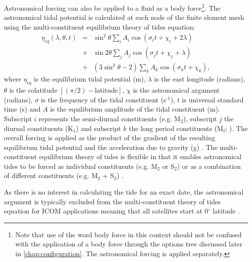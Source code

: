 Astronomical forcing can also be applied to a fluid as a body force\footnote{Note that use of the word body force in this context should not be confused with the application of a body force through the options tree discussed later in \ref{chap:configuration}. The astronomical forcing is applied separately.}. 
The astronomical tidal potential is calculated at each node of the finite element mesh using the 
multi-constituent equilibrium theory of tides equation:
  \begin{eqnarray}
\eta_{eq}\left(\lambda,\theta,t\right)&=&\sin^{2}\theta\sum_{i}A_{i}\cos\left(\sigma_{i}t+\chi_{i}+2\lambda\right)\nonumber\\
&+&\sin2\theta\sum_{j}A_{j}\cos\left(\sigma_{j}t+\chi_{j}+\lambda\right)\\
&+&\left(3\sin^{2}\theta-2\right)\sum_{k}A_{k}\cos\left(\sigma_{k}t+\chi_{k}\right)\nonumber,
\label{eq:multi-constituent-eq_theory}
  \end{eqnarray}
where $\eta_{eq}$ is the equilibrium tidal potential (m), $\lambda$ is the east longitude (radians), $\theta$ is the colatitude
$[(\pi/2)-{\text{latitude}}]$, $\chi$ is the astronomical argument (radians), $\sigma$
is the frequency of the tidal constituent (s$^{\text{-1}}$), $t$ is universal standard
time (s) and $A$ is the equilibrium amplitude of the tidal constituent (m). Subscript
$i$ represents the semi-diurnal constituents (e.g. M$_{\text{2}}$), subscript $j$
the diurnal constituents (\eg K$_{\text{1}}$) and subscript $k$ the long period
constituents (\eg M$_{\text{f}}$; \citealp{Wells2008}).   
The overall forcing 
is applied as the product of the gradient of the resulting equilibrium tidal potential and the acceleration due 
to gravity (g) \citep{Mellor1996, Kantha2000, Wells2007}.
The multi-constituent equilibrium theory of tides is flexible in that it enables astronomical tides to be forced as 
individual constituents 
(e.g. M$_{2}$ or S$_{2}$) or as a combination of different constituents (e.g. M$_{2}$ + S$_{2}$) \citep{Wells2008}.

As there is no interest in calculating the tide for an exact date, the astronomical argument 
is typically excluded from the multi-constituent theory of tides equation for ICOM applications meaning that all satellites 
start at 0$^{\circ}$ latitude \citep{Wells2008}.

